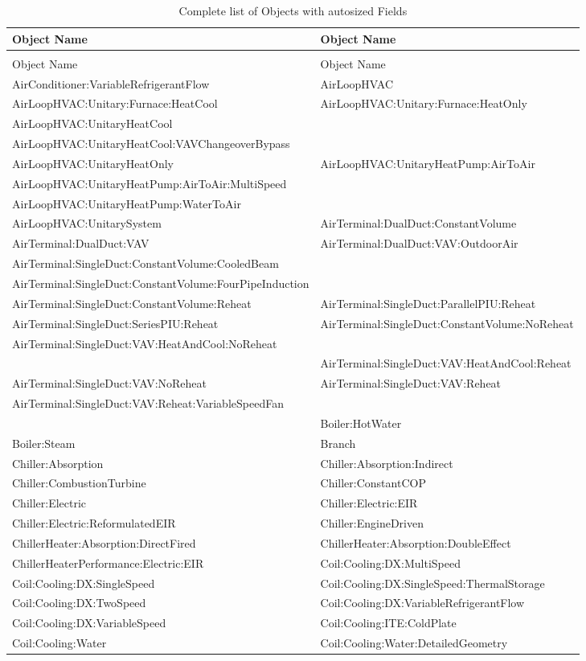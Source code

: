 \begin{longtable}[c]{p{3.3in}p{3.3in}}
\caption{Complete list of Objects with autosized Fields \label{table:complete-list-of-objects-with-autosized}} \tabularnewline
\toprule
Object Name & Object Name \tabularnewline
\midrule
\endfirsthead

\caption[]{Complete list of Objects with autosized Fields} \tabularnewline
\toprule
Object Name & Object Name \tabularnewline
\midrule
\endhead

AirConditioner:VariableRefrigerantFlow & AirLoopHVAC \tabularnewline
AirLoopHVAC:Unitary:Furnace:HeatCool & AirLoopHVAC:Unitary:Furnace:HeatOnly \tabularnewline
AirLoopHVAC:UnitaryHeatCool & \tabularnewline
AirLoopHVAC:UnitaryHeatCool:VAVChangeoverBypass & \tabularnewline
AirLoopHVAC:UnitaryHeatOnly & AirLoopHVAC:UnitaryHeatPump:AirToAir \tabularnewline
AirLoopHVAC:UnitaryHeatPump:AirToAir:MultiSpeed & \tabularnewline
AirLoopHVAC:UnitaryHeatPump:WaterToAir & \tabularnewline
AirLoopHVAC:UnitarySystem & AirTerminal:DualDuct:ConstantVolume \tabularnewline
AirTerminal:DualDuct:VAV & AirTerminal:DualDuct:VAV:OutdoorAir \tabularnewline
AirTerminal:SingleDuct:ConstantVolume:CooledBeam & \tabularnewline
AirTerminal:SingleDuct:ConstantVolume:FourPipeInduction & \tabularnewline
AirTerminal:SingleDuct:ConstantVolume:Reheat & AirTerminal:SingleDuct:ParallelPIU:Reheat \tabularnewline
AirTerminal:SingleDuct:SeriesPIU:Reheat & AirTerminal:SingleDuct:ConstantVolume:NoReheat \tabularnewline
AirTerminal:SingleDuct:VAV:HeatAndCool:NoReheat & \tabularnewline
 & AirTerminal:SingleDuct:VAV:HeatAndCool:Reheat \tabularnewline
AirTerminal:SingleDuct:VAV:NoReheat & AirTerminal:SingleDuct:VAV:Reheat \tabularnewline
AirTerminal:SingleDuct:VAV:Reheat:VariableSpeedFan & \tabularnewline
 & Boiler:HotWater \tabularnewline
Boiler:Steam & Branch \tabularnewline
Chiller:Absorption & Chiller:Absorption:Indirect \tabularnewline
Chiller:CombustionTurbine & Chiller:ConstantCOP \tabularnewline
Chiller:Electric & Chiller:Electric:EIR \tabularnewline
Chiller:Electric:ReformulatedEIR & Chiller:EngineDriven \tabularnewline
ChillerHeater:Absorption:DirectFired & ChillerHeater:Absorption:DoubleEffect \tabularnewline
ChillerHeaterPerformance:Electric:EIR & Coil:Cooling:DX:MultiSpeed \tabularnewline
Coil:Cooling:DX:SingleSpeed & Coil:Cooling:DX:SingleSpeed:ThermalStorage \tabularnewline
Coil:Cooling:DX:TwoSpeed & Coil:Cooling:DX:VariableRefrigerantFlow \tabularnewline
Coil:Cooling:DX:VariableSpeed & Coil:Cooling:ITE:ColdPlate \tabularnewline
Coil:Cooling:Water & Coil:Cooling:Water:DetailedGeometry \tabularnewline

\end{longtable}
